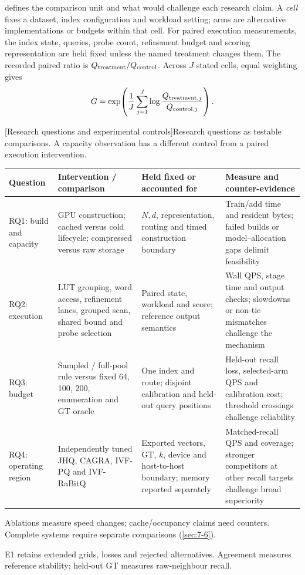  defines the comparison unit and what would challenge
each research claim. A \emph{cell} fixes a dataset, index configuration and
workload setting; arms are alternative implementations or budgets within
that cell. For paired execution measurements, the index state, queries,
probe count, refinement budget and scoring representation are held fixed
unless the named treatment changes them. The recorded paired ratio is
$Q_{\rm treatment}/Q_{\rm control}$. Across $J$ stated cells, equal weighting gives
\[
 G=\exp\!\left(\frac1J\sum_{j=1}^{J}
 \log\frac{Q_{{\rm treatment},j}}{Q_{{\rm control},j}}\right).
\]

\par\medskip\noindent\begin{minipage}{\linewidth}
\centering\captionsetup{hypcap=false}
[Research questions and experimental controls]{Research questions as testable comparisons. A capacity observation
has a different control from a paired execution intervention.}
\label{tab:3-design}
\footnotesize\setlength{\tabcolsep}{3pt}
\begin{tabularx}{\linewidth}{@{}>{\raggedright\arraybackslash}p{.11\linewidth}*{3}{>{\raggedright\arraybackslash}X}@{}}
\toprule
Question & Intervention / comparison & Held fixed or accounted for & Measure and counter-evidence \\
\midrule
RQ1: build and capacity & GPU construction; cached versus cold lifecycle;
compressed versus raw storage & $N,d$, representation, routing and timed
construction boundary & Train/add time and resident bytes; failed builds
or model--allocation gaps delimit feasibility \\
RQ2: execution & LUT grouping, word access, refinement lanes, grouped scan,
shared bound and probe selection & Paired state, workload and score;
reference output semantics & Wall QPS, stage time and output checks;
slowdowns or non-tie mismatches challenge the mechanism \\
RQ3: budget & Sampled / full-pool rule versus fixed 64, 100, 200,
enumeration and GT oracle & One index and route; disjoint calibration
and held-out query positions & Held-out recall loss, selected-arm QPS
and calibration cost; threshold crossings challenge reliability \\
RQ4: operating region & Independently tuned JHQ, CAGRA, IVF-PQ and
IVF-RaBitQ & Exported vectors, GT, $k$, device and host-to-host boundary;
memory reported separately & Matched-recall QPS and coverage; stronger
competitors at other recall targets challenge broad superiority \\
\bottomrule
\end{tabularx}
\end{minipage}\par\medskip

Ablations measure speed changes; cache/occupancy claims need counters. Complete systems require separate comparisons (\cref{sec:7-6}).

E1 retains extended grids, losses and rejected alternatives. Agreement measures reference stability; held-out GT measures raw-neighbour recall.